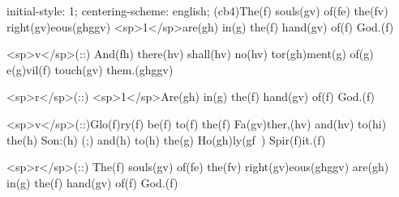 initial-style: 1;
centering-scheme: english;
(cb4)The(f) souls(gv) of(fe) the(fv) right(gv)eous(ghggv) <sp>1</sp>are(gh) in(g) the(f) hand(gv) of(f) God.(f) 

<sp>v</sp>(::) And(fh) there(hv) shall(hv) no(hv) tor(gh)ment(g) of(g) e(g)vil(f) touch(gv) them.(ghggv)

<sp>r</sp>(::) <sp>1</sp>Are(gh) in(g) the(f) hand(gv) of(f) God.(f) 

<sp>v</sp>(::)Glo(f)ry(f) be(f) to(f) the(f) Fa(gv)ther,(hv) and(hv) to(hi) the(h) Son:(h) (;) and(h) to(h) the(g) Ho(gh)ly(gf~) Spir(f)it.(f)

<sp>r</sp>(::) The(f) souls(gv) of(fe) the(fv) right(gv)eous(ghggv) are(gh) in(g) the(f) hand(gv) of(f) God.(f) 